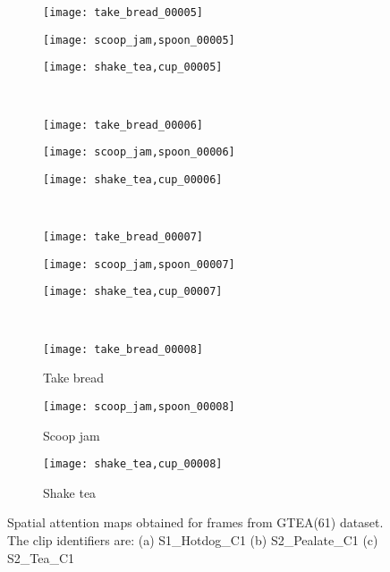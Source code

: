 \documentclass{bmvc2k}
\begin{document}
\begin{figure}[h]
\begin{subfigure}[b]{0.32\textwidth}
		\texttt{[image: take\_bread\_00005]}
	\end{subfigure}
	\begin{subfigure}[b]{0.32\textwidth}
		\texttt{[image: scoop\_jam,spoon\_00005]}
	\end{subfigure}
	\begin{subfigure}[b]{0.32\textwidth}
		\texttt{[image: shake\_tea,cup\_00005]}
	\end{subfigure}\\
	\vskip 2mm
	\begin{subfigure}[b]{0.32\textwidth}
		\texttt{[image: take\_bread\_00006]}
	\end{subfigure}
	\begin{subfigure}[b]{0.32\textwidth}
		\texttt{[image: scoop\_jam,spoon\_00006]}
	\end{subfigure}
	\begin{subfigure}[b]{0.32\textwidth}
		\texttt{[image: shake\_tea,cup\_00006]}
	\end{subfigure}\\
	\vskip 2mm
	\begin{subfigure}[b]{0.32\textwidth}
		\texttt{[image: take\_bread\_00007]}
	\end{subfigure}
	\begin{subfigure}[b]{0.32\textwidth}
		\texttt{[image: scoop\_jam,spoon\_00007]}
	\end{subfigure}
	\begin{subfigure}[b]{0.32\textwidth}
		\texttt{[image: shake\_tea,cup\_00007]}
	\end{subfigure}\\
	\vskip 2mm
	\begin{subfigure}[b]{0.32\textwidth}
		\texttt{[image: take\_bread\_00008]}
		\caption{Take bread}
	\end{subfigure}
	\begin{subfigure}[b]{0.32\textwidth}
		\texttt{[image: scoop\_jam,spoon\_00008]}
		\caption{Scoop jam}
	\end{subfigure}
	\begin{subfigure}[b]{0.32\textwidth}
		\texttt{[image: shake\_tea,cup\_00008]}
		\caption{Shake tea}
	\end{subfigure}
			\vspace*{2mm}
	\caption{Spatial attention maps obtained for frames from GTEA(61) dataset. The clip identifiers are: (a) S1\_Hotdog\_C1 (b) S2\_Pealate\_C1 (c) S2\_Tea\_C1}
	\label{fig:fig_ex3}
\end{figure}
\FloatBarrier
\end{document}

